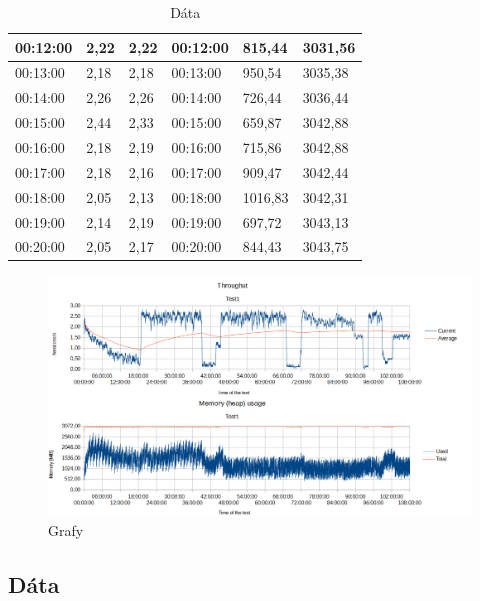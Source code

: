 \begin{table}[!htb]
\begin{tabular}{|l|l|l|l|l|l|}
00:12:00      & 2,22             & 2,22             & 00:12:00      & 815,44        & 3031,56        \\ \hline
00:13:00      & 2,18             & 2,18             & 00:13:00      & 950,54        & 3035,38        \\ \hline
00:14:00      & 2,26             & 2,26             & 00:14:00      & 726,44        & 3036,44        \\ \hline
00:15:00      & 2,44             & 2,33             & 00:15:00      & 659,87        & 3042,88        \\ \hline
00:16:00      & 2,18             & 2,19             & 00:16:00      & 715,86        & 3042,88        \\ \hline
00:17:00      & 2,18             & 2,16             & 00:17:00      & 909,47        & 3042,44        \\ \hline
00:18:00      & 2,05             & 2,13             & 00:18:00      & 1016,83       & 3042,31        \\ \hline
00:19:00      & 2,14             & 2,19             & 00:19:00      & 697,72        & 3043,13        \\ \hline
00:20:00      & 2,05             & 2,17             & 00:20:00      & 844,43        & 3043,75        \\ \hline
\end{tabular}
\caption{Dáta}\label{tab:Data}
\end{table}

\begin{figure}[!htb]
\centering
\includegraphics[scale=0.75, angle =90]{graphs.png}
\caption{Grafy}\label{grafy}
\end{figure}

\subsection{Dáta}

